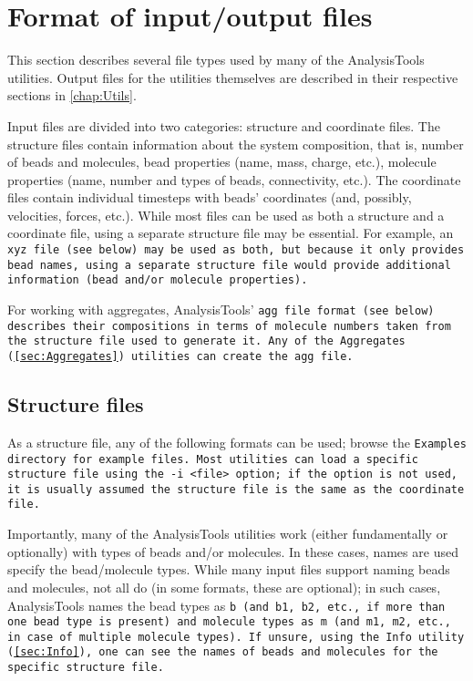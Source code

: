 \chapter{Format of input/output files}\label{chap:input}

This section describes several file types used by many of the
AnalysisTools utilities. Output files for the utilities themselves are
described in their respective sections in \cref{chap:Utils}.

Input files are divided into two categories: structure and coordinate files. The
structure files contain information about the system composition, that is,
number of beads and molecules, bead properties (name, mass, charge, etc.),
molecule properties (name, number and types of beads, connectivity, etc.). The
coordinate files contain individual timesteps with beads' coordinates (and,
possibly, velocities, forces, etc.). While most files can be used as both a
structure and a coordinate file, using a separate structure file may be
essential. For example, an \tt{xyz} file (see below) may be used as both, but
because it only provides bead names, using a separate structure file would
provide additional information (bead and/or molecule properties).

For working with aggregates, AnalysisTools' \tt{agg} file format (see below)
describes their compositions in terms of molecule numbers taken from the
structure file used to generate it. Any of the \tt{Aggregates}
(\cref{sec:Aggregates}) utilities can create the \tt{agg} file.

\section{Structure files}\label{sec:StructFile}
As a structure file, any of the following formats can be used; browse the
\tt{Examples} directory for example files. Most utilities can load a specific
structure file using the \tt{-i <file>} option; if the option is not used, it is
usually assumed the structure file is the same as the coordinate file.

Importantly, many of the AnalysisTools utilities work (either fundamentally or
optionally) with types of beads and/or molecules. In these cases, names are used
specify the bead/molecule types. While many input files support naming beads and
molecules, not all do (in some formats, these are optional); in such cases,
AnalysisTools names the bead types as \tt{b} (and \tt{b1}, \tt{b2}, etc., if
more than one bead type is present) and molecule types as \tt{m} (and \tt{m1},
\tt{m2}, etc., in case of multiple molecule types). If unsure, using the Info
utility (\cref{sec:Info}), one can see the names of beads and molecules for the
specific structure file.

